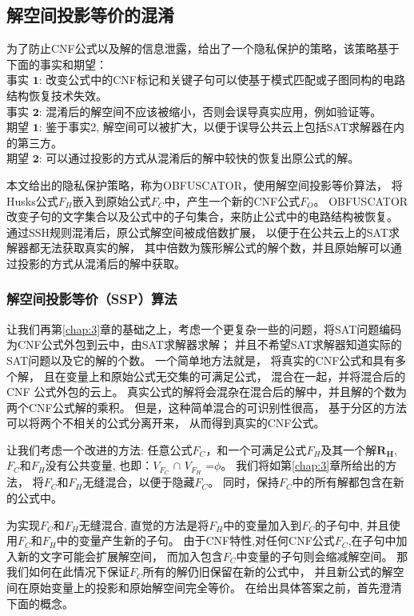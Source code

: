 \subsection{解空间投影等价的混淆}\label{4:obfuscating}

为了防止CNF公式以及解的信息泄露，给出了一个隐私保护的策略，该策略基于下面的事实和期望：
\\$\textbf{事实 1:}$ 改变公式中的CNF标记和关键子句可以使基于模式匹配或子图同构的电路结构恢复技术失效。
\\$\textbf{事实 2:}$ 混淆后的解空间不应该被缩小，否则会误导真实应用，例如验证等。
\\$\textbf{期望 1:}$ 鉴于事实2, 解空间可以被扩大，以便于误导公共云上包括SAT求解器在内的第三方。
\\$\textbf{期望 2:}$ 可以通过投影的方式从混淆后的解中较快的恢复出原公式的解。

本文给出的隐私保护策略，称为OBFUSCATOR，使用解空间投影等价算法，
将Husks公式$F_H$嵌入到原始公式$F_C$中，产生一个新的CNF公式$F_O$。
OBFUSCATOR改变子句的文字集合以及公式中的子句集合，来防止公式中的电路结构被恢复。
通过SSH规则混淆后，原公式解空间被成倍数扩展，
以便于在公共云上的SAT求解器都无法获取真实的解，
其中倍数为簇形解公式的解个数，并且原始解可以通过投影的方式从混淆后的解中获取。

\subsubsection{解空间投影等价（SSP）算法}\label{4:embeded rules3}

让我们再第\ref{chap:3}章的基础之上，考虑一个更复杂一些的问题，将SAT问题编码为CNF公式外包到云中，由SAT求解器求解；
并且不希望SAT求解器知道实际的SAT问题以及它的解的个数。
一个简单地方法就是，
将真实的CNF公式和具有多个解，
且在变量上和原始公式无交集的可满足公式，
混合在一起，并将混合后的CNF 公式外包的云上。
真实公式的解将会混杂在混合后的解中，并且解的个数为两个CNF公式解的乘积。
但是，这种简单混合的可识别性很高，
基于分区\cite{Partition}的方法可以将两个不相关的公式分离开来，
从而得到真实的CNF公式。

让我们考虑一个改进的方法:
任意公式$F_C$，和一个可满足公式$F_H$及其一个解\textsl{${\textbf{R}}_{\textbf{H}}$},
$F_C$和$F_H$没有公共变量, 也即：$V_{F_C}$ $\cap$ $V_{F_H}$ =$\phi$。
我们将如第\ref{chap:3}章所给出的方法，
将$F_C$和$F_H$无缝混合，以便于隐藏$F_C$。
同时，保持$F_C$中的所有解都包含在新的公式中。

为实现$F_C$和$F_H$无缝混合,
直觉的方法是将$F_H$中的变量加入到$F_C$的子句中,
并且使用$F_C$和$F_H$中的变量产生新的子句。
由于CNF特性,对任何CNF公式$F_C$,在子句中加入新的文字可能会扩展解空间，
而加入包含$F_C$中变量的子句则会缩减解空间。
那我们如何在此情况下保证$F_C$所有的解仍旧保留在新的公式中，
并且新公式的解空间在原始变量上的投影和原始解空间完全等价。
在给出具体答案之前，首先澄清下面的概念。

